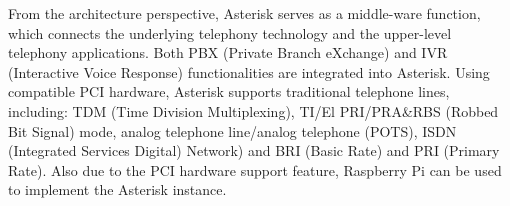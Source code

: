 From the architecture perspective, Asterisk serves as a middle-ware function, which connects the underlying telephony technology and the upper-level telephony applications. Both PBX (Private Branch eXchange) and IVR (Interactive Voice Response) functionalities are integrated into Asterisk. Using compatible PCI hardware, Asterisk supports traditional telephone lines, including: TDM (Time Division Multiplexing), TI/El PRI/PRA\&RBS (Robbed Bit Signal) mode, analog telephone line/analog telephone (POTS), ISDN (Integrated Services Digital) Network) and BRI (Basic Rate) and PRI (Primary Rate). Also due to the PCI hardware support feature, Raspberry Pi can be used to implement the Asterisk instance.